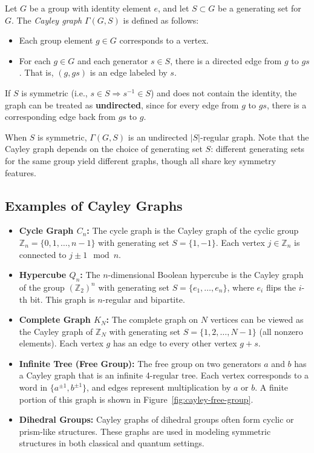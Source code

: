 \documentclass[12pt]{report}
\begin{document}
Let $G$ be a group with identity element $e$, and let $S \subset G$ be a generating set for $G$. The \emph{Cayley graph} $\Gamma(G,S)$ is defined as follows:
\begin{itemize}
    \item Each group element $g \in G$ corresponds to a vertex.
    \item For each $g \in G$ and each generator $s \in S$, there is a directed edge from $g$ to $gs$. That is, $(g, gs)$ is an edge labeled by $s$.
\end{itemize}

If $S$ is symmetric (i.e., $s \in S \Rightarrow s^{-1} \in S$) and does not contain the identity, the graph can be treated as \textbf{undirected}, since for every edge from $g$ to $gs$, there is a corresponding edge back from $gs$ to $g$.

When $S$ is symmetric, $\Gamma(G, S)$ is an undirected $|S|$-regular graph. Note that the Cayley graph depends on the choice of generating set $S$: different generating sets for the same group yield different graphs, though all share key symmetry features.

\subsection{Examples of Cayley Graphs}

\begin{itemize}
    \item \textbf{Cycle Graph $C_n$:} The cycle graph is the Cayley graph of the cyclic group $\mathbb{Z}_n = \{0, 1, \dots, n-1\}$ with generating set $S = \{1, -1\}$. Each vertex $j \in \mathbb{Z}_n$ is connected to $j \pm 1 \mod n$.

    \item \textbf{Hypercube $Q_n$:} The $n$-dimensional Boolean hypercube is the Cayley graph of the group $(\mathbb{Z}_2)^n$ with generating set $S = \{e_1, \dots, e_n\}$, where $e_i$ flips the $i$-th bit. This graph is $n$-regular and bipartite.

    \item \textbf{Complete Graph $K_N$:} The complete graph on $N$ vertices can be viewed as the Cayley graph of $\mathbb{Z}_N$ with generating set $S = \{1, 2, \dots, N-1\}$ (all nonzero elements). Each vertex $g$ has an edge to every other vertex $g+s$.

    \item \textbf{Infinite Tree (Free Group):} The free group on two generators $a$ and $b$ has a Cayley graph that is an infinite 4-regular tree. Each vertex corresponds to a word in $\{a^{\pm1}, b^{\pm1}\}$, and edges represent multiplication by $a$ or $b$. A finite portion of this graph is shown in Figure~\ref{fig:cayley-free-group}.

    \item \textbf{Dihedral Groups:} Cayley graphs of dihedral groups often form cyclic or prism-like structures. These graphs are used in modeling symmetric structures in both classical and quantum settings.
\end{itemize}
\end{document}
